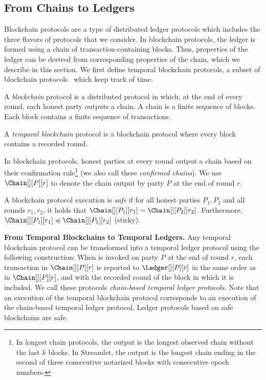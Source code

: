 \subsection{From Chains to Ledgers}

Blockchain protocols are a type of distributed ledger protocols which includes the three flavors of protocols that we consider.
In blockchain protocols, the ledger is formed using a chain of transaction-containing blocks. Thus, properties of the ledger can be derived from corresponding properties of the chain, which we describe in this section.
We first define temporal blockchain protocols,
a subset of blockchain protocols~\cite{rethinking-consensus}
which keep track of time.

\begin{definition}
  A \emph{blockchain} protocol is a distributed protocol
  in which, at the end of every round, each honest party outputs
  a chain. A chain is a finite sequence of blocks. Each block
  contains a finite sequence of transactions.

  A \emph{temporal blockchain} protocol is a blockchain protocol
  where every block contains a recorded round.
\end{definition}

In blockchain protocols, honest parties at every round output a chain
based on their confirmation rule\footnote{
  In longest chain protocols, the output is the longest observed chain without the last $k$ blocks.
  In Streamlet, the output is the longest chain ending in the second of three consecutive notarized
  blocks with consecutive epoch numbers.
} (we also call these \emph{confirmed chains}).
We use $\Chain[][P][r]$ to denote the chain output
by party $P$ at the end of round $r$.

\begin{definition}
  A blockchain protocol execution is \emph{safe} if for
  all honest parties $P_1, P_2$ and all rounds $r_1, r_2$,
  it holds that $\Chain[][P_1][r_1] \sim \Chain[][P_2][r_2]$.
  Furthermore, $\Chain[][P_1][r_1] \preccurlyeq \Chain[][P_1][r_2]$ (sticky).
\end{definition}

\noindent
\textbf{From Temporal Blockchains to Temporal Ledgers.}
Any temporal blockchain protocol can be transformed into a
temporal ledger protocol using the following construction:
When \rread is invoked on party $P$ at the end of round $r$, each transaction in
$\Chain[][P][r]$ is reported to $\Ledger[][P][r]$ in the same order as in $\Chain[][P][r]$, and with
the recorded round of the block in which it is included.
We call these protocols \emph{chain-based temporal ledger protocols}.
Note that an execution of the temporal blockchain protocol corresponds to an execution of the chain-based temporal ledger protocol.
Ledger protocols based on safe blockchains are safe.


